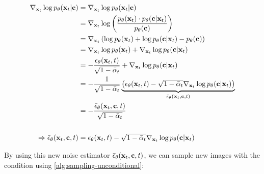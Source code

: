 \begin{equation}
   \label{eqn:derive-new-noise-estimator}
   \begin{aligned}
      \nabla_{\mathbf{x}_t} \log p_\theta(\mathbf{x}_t|\mathbf{c})           & = \nabla_{\mathbf{x}_t} \log p_\theta(\mathbf{x}_t|\mathbf{c})                                                                                                                                                           \\
                                                      & = \nabla_{\mathbf{x}_t} \log \left( \frac{p_\theta(\mathbf{x}_t) \cdot p_\theta(\mathbf{c}|\mathbf{x}_t)}{p_\theta(\mathbf{c})} \right)                                                                                                 \\
                                                      & = \nabla_{\mathbf{x}_t} \left( \log p_\theta(\mathbf{x}_t) + \log p_\theta(\mathbf{c}|\mathbf{x}_t) - p_\theta(\mathbf{c}) \right)                                                                                                      \\
                                                      & = \nabla_{\mathbf{x}_t} \log p_\theta(\mathbf{x}_t) + \nabla_{\mathbf{x}_t} \log p_\theta(\mathbf{c}|\mathbf{x}_t)                                                                                                                       \\
                                                      & =  - \frac{\epsilon_\theta(\mathbf{x}_t, t)}{\sqrt{1 - \bar{\alpha}_t}} + \nabla_{\mathbf{x}_t} \log p_\theta(\mathbf{c}|\mathbf{x}_t)                                                                                           \\
                                                      & = -\frac{1}{\sqrt{1 - \bar{\alpha}_t}} \underbrace{\left(\epsilon_\theta(\mathbf{x}_t, t) - \sqrt{1 - \bar{\alpha}_t} \nabla_{\mathbf{x}_t} \log p_\theta(\mathbf{c}|\mathbf{x}_t)\right)}_{\bar{\epsilon}_\theta(\mathbf{x}_t, \mathbf{c}, t)} \\
                                                      & = -\frac{\bar{\epsilon}_\theta(\mathbf{x}_t, \mathbf{c}, t)}{\sqrt{1 - \bar{\alpha}_t}}                                                                                                                          \\
      \\
      \Rightarrow \bar{\epsilon}_\theta(\mathbf{x}_t, \mathbf{c}, t) & = \epsilon_\theta(\mathbf{x}_t, t) - \sqrt{1 - \bar{\alpha}_t} \nabla_{\mathbf{x}_t} \log p_\theta(\mathbf{c}|\mathbf{x}_t)
   \end{aligned}
\end{equation}

By using this new noise estimator $\bar{\epsilon}_\theta(\mathbf{x}_t, \mathbf{c}, t)$, we can sample new images with the condition using \autoref{alg:sampling-unconditional}: 

